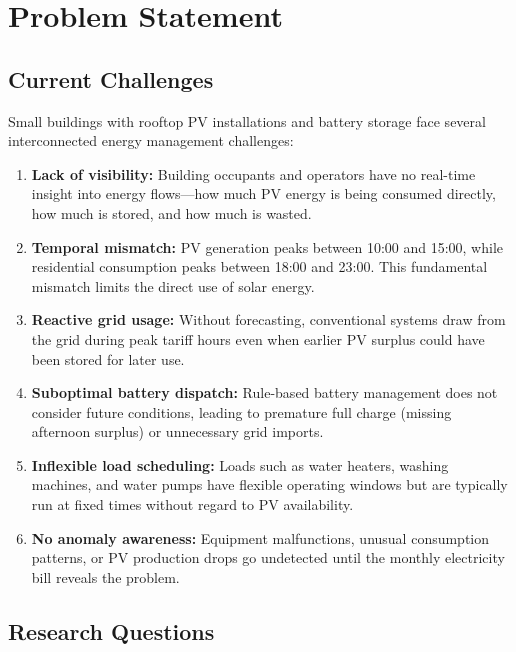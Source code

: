 \chapter{Problem Statement}
\label{ch:problem}

\section{Current Challenges}

Small buildings with rooftop PV installations and battery storage face several interconnected energy management challenges:

\begin{enumerate}
    \item \textbf{Lack of visibility:} Building occupants and operators have no real-time insight into energy flows---how much PV energy is being consumed directly, how much is stored, and how much is wasted.

    \item \textbf{Temporal mismatch:} PV generation peaks between 10:00 and 15:00, while residential consumption peaks between 18:00 and 23:00. This fundamental mismatch limits the direct use of solar energy.

    \item \textbf{Reactive grid usage:} Without forecasting, conventional systems draw from the grid during peak tariff hours even when earlier PV surplus could have been stored for later use.

    \item \textbf{Suboptimal battery dispatch:} Rule-based battery management does not consider future conditions, leading to premature full charge (missing afternoon surplus) or unnecessary grid imports.

    \item \textbf{Inflexible load scheduling:} Loads such as water heaters, washing machines, and water pumps have flexible operating windows but are typically run at fixed times without regard to PV availability.

    \item \textbf{No anomaly awareness:} Equipment malfunctions, unusual consumption patterns, or PV production drops go undetected until the monthly electricity bill reveals the problem.
\end{enumerate}

\section{Research Questions}

